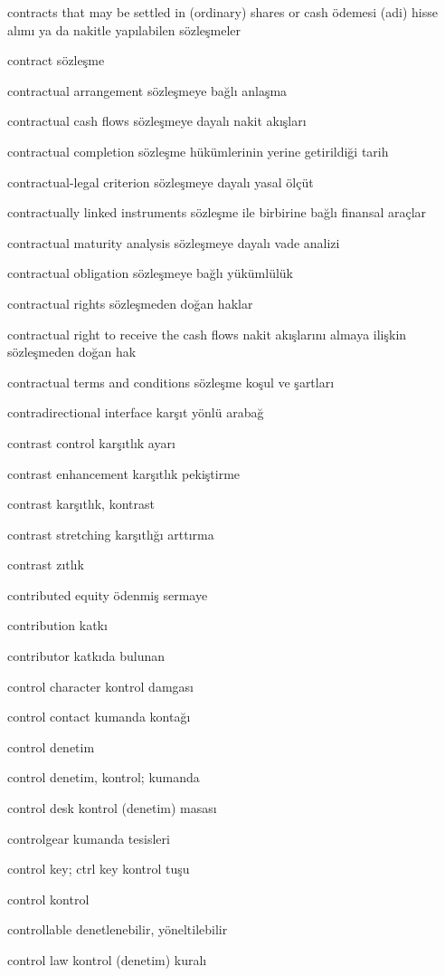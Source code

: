 \documentclass[12pt,fleqn]{article}\usepackage{../../common}
\begin{document}
contracts that may be settled in (ordinary) shares or cash ödemesi (adi) hisse alımı ya da nakitle yapılabilen sözleşmeler

contract sözleşme

contractual arrangement sözleşmeye bağlı anlaşma

contractual cash flows sözleşmeye dayalı nakit akışları

contractual completion sözleşme hükümlerinin yerine getirildiği tarih

contractual-legal criterion sözleşmeye dayalı yasal ölçüt

contractually linked instruments sözleşme ile birbirine bağlı finansal araçlar

contractual maturity analysis sözleşmeye dayalı vade analizi

contractual obligation sözleşmeye bağlı yükümlülük

contractual rights sözleşmeden doğan haklar

contractual right to receive the cash flows nakit akışlarını almaya ilişkin sözleşmeden doğan hak

contractual terms and conditions sözleşme koşul ve şartları

contradirectional interface karşıt yönlü arabağ

contrast control karşıtlık ayarı

contrast enhancement karşıtlık pekiştirme

contrast karşıtlık, kontrast

contrast stretching karşıtlığı arttırma

contrast zıtlık

contributed equity ödenmiş sermaye

contribution katkı

contributor katkıda bulunan

control character kontrol damgası

control contact kumanda kontağı

control denetim

control denetim, kontrol; kumanda

control desk kontrol (denetim) masası

controlgear kumanda tesisleri

control key; ctrl key kontrol tuşu

control kontrol

controllable denetlenebilir, yöneltilebilir

control law kontrol (denetim) kuralı
\end{document}

